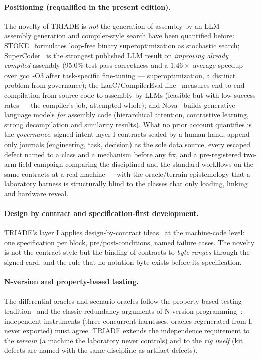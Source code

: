 \documentclass[11pt,a4paper]{article}
\begin{document}
\paragraph{Positioning (requalified in the present edition).}
The novelty of TRIADE is \emph{not} the generation of assembly by an
LLM --- assembly generation and compiler-style search have been
quantified before: STOKE~\cite{stoke} formulates loop-free binary
superoptimization as stochastic search; SuperCoder~\cite{supercoder}
is the strongest published LLM result on \emph{improving already
compiled} assembly (95.0\% test-pass correctness and a $1.46\times$
average speedup over gcc~-O3 after task-specific fine-tuning ---
superoptimization, a distinct problem from governance);
the LaaC/CompilerEval line~\cite{laac} measures end-to-end compilation
from source code to assembly by LLMs (feasible but with low success
rates --- the compiler's job, attempted whole);
and Nova~\cite{nova} builds generative language models \emph{for}
assembly code (hierarchical attention, contrastive learning, strong
decompilation and similarity results). What no
prior account quantifies is the \emph{governance}: signed-intent
layer-I contracts sealed by a human hand, append-only journals
(engineering, task, decision) as the sole data source, every escaped
defect named to a class and a mechanism before any fix, and a
pre-registered two-arm field campaign comparing the disciplined and
the standard workflows on the same contracts at a real machine ---
with the oracle/terrain epistemology that a laboratory harness is
structurally blind to the classes that only loading, linking and
hardware reveal.

\paragraph{Design by contract and specification-first development.}
TRIADE's layer I applies design-by-contract ideas~\cite{meyer1992} at the
machine-code level: one specification per block, pre/post-conditions,
named failure cases. The novelty is not the contract style but the
binding of contracts to \emph{byte ranges} through the signed card, and
the rule that no notation byte exists before its specification.

\paragraph{N-version and property-based testing.} The differential
oracles and scenario oracles follow the property-based testing
tradition~\cite{claessen2000} and the classic redundancy arguments of
N-version programming~\cite{avizienis1985}: independent instruments (three
concurrent harnesses, oracles regenerated from I, never exported) must
agree. TRIADE extends the independence requirement to the \emph{terrain}
(a machine the laboratory never controls) and to the \emph{rig itself}
(kit defects are named with the same discipline as artifact defects).
\end{document}

